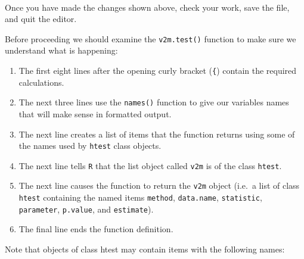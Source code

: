 \documentclass[
  12pt,
  a4paper]{book}
\begin{document}
~

Once you have made the changes shown above, check your work, save the file, and quit the editor.

Before proceeding we should examine the \texttt{v2m.test()} function to make sure we understand what is happening:

\begin{enumerate}
\def\labelenumi{\arabic{enumi}.}
\item
  The first eight lines after the opening curly bracket (\texttt{\{}) contain the required calculations.
\item
  The next three lines use the \texttt{names()} function to give our variables names that will make sense in formatted output.
\item
  The next line creates a list of items that the function returns using some of the names used by \texttt{htest} class objects.
\item
  The next line tells \texttt{R} that the list object called \texttt{v2m} is of the class \texttt{htest}.
\item
  The next line causes the function to return the \texttt{v2m} object (i.e.~a list of class \texttt{htest} containing the named items \texttt{method}, \texttt{data.name}, \texttt{statistic}, \texttt{parameter}, \texttt{p.value}, and \texttt{estimate}).
\item
  The final line ends the function definition.
\end{enumerate}

Note that objects of class htest may contain items with the following names:

~
\end{document}

